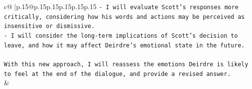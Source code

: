 \documentclass{article}
\begin{document}
{\begin{supertabular}{c@{$\;$}|p{.15\linewidth}@{}p{.15\linewidth}p{.15\linewidth}p{.15\linewidth}p{.15\linewidth}p{.15\linewidth}}
{{{\texttt{{-} I will evaluate Scott's responses more critically, considering how his words and actions may be perceived as insensitive or dismissive.} \\
\texttt{{-} I will consider the long{-}term implications of Scott's decision to leave, and how it may affect Deirdre's emotional state in the future.} \\
\\ 
\texttt{With this new approach, I will reassess the emotions Deirdre is likely to feel at the end of the dialogue, and provide a revised answer.} \\
            }
        }
    }
    & \\ \\

\end{supertabular}
}
\end{document}
